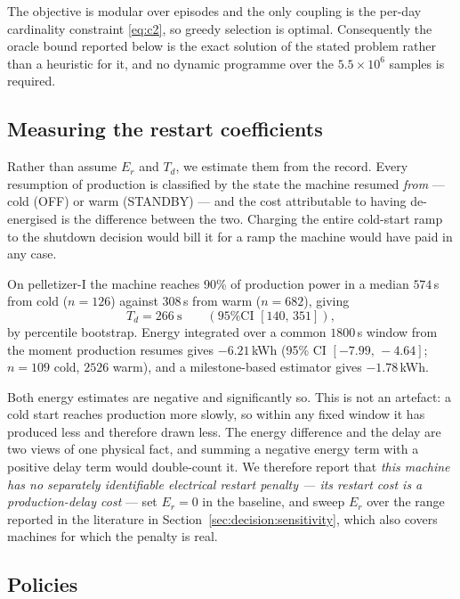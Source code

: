 \noindent
The objective is modular over episodes and the only coupling is the
per-day cardinality constraint \eqref{eq:c2}, so greedy selection is
optimal. Consequently the oracle bound reported below is the exact
solution of the stated problem rather than a heuristic for it, and no
dynamic programme over the $5.5\times10^{6}$ samples is required.

\subsection{Measuring the restart coefficients}
\label{sec:decision:coeff}

Rather than assume $E_r$ and $T_d$, we estimate them from the record.
Every resumption of production is classified by the state the machine
resumed \emph{from} --- cold (OFF) or warm (STANDBY) --- and the cost
attributable to having de-energised is the difference between the two.
Charging the entire cold-start ramp to the shutdown decision would bill
it for a ramp the machine would have paid in any case.

On pelletizer-I the machine reaches 90\% of production power in a median
$574$\,s from cold ($n=126$) against $308$\,s from warm ($n=682$), giving
\begin{equation}
T_{d} = 266\ \text{s}\qquad (\text{95\% CI } [140,\,351]),
\end{equation}
by percentile bootstrap. Energy integrated over a common $1800$\,s
window from the moment production resumes gives
$-6.21$\,kWh (95\% CI $[-7.99,\,-4.64]$; $n=109$ cold, $2526$ warm), and
a milestone-based estimator gives $-1.78$\,kWh.

Both energy estimates are negative and significantly so. This is not an
artefact: a cold start reaches production more slowly, so within any
fixed window it has produced less and therefore drawn less. The energy
difference and the delay are two views of one physical fact, and summing
a negative energy term with a positive delay term would double-count it.
We therefore report that \emph{this machine has no separately
identifiable electrical restart penalty --- its restart cost is a
production-delay cost} --- set $E_r = 0$ in the baseline, and sweep $E_r$
over the range reported in the literature in
Section~\ref{sec:decision:sensitivity}, which also covers machines for
which the penalty is real.

\subsection{Policies}
\label{sec:decision:policies}

